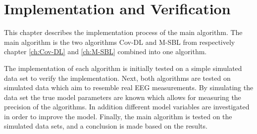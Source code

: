 \chapter{Implementation and Verification}\label{ch:implementation}
This chapter describes the implementation process of the main algorithm. 
The main algorithm is the two algorithms Cov-DL and M-SBL from respectively chapter \ref{ch:Cov-DL} and \ref{ch:M-SBL} combined into one algorithm.

The implementation of each algorithm is initially tested on a simple simulated data set to verify the implementation. 
Next, both algorithms are tested on simulated data which aim to resemble real EEG measurements. 
By simulating the data set the true model parameters are known which allows for measuring the precision of the algorithms. 
In addition different model variables are investigated in order to improve the model.
Finally, the main algorithm is tested on the simulated data sets, and a conclusion is made based on the results.  






   






